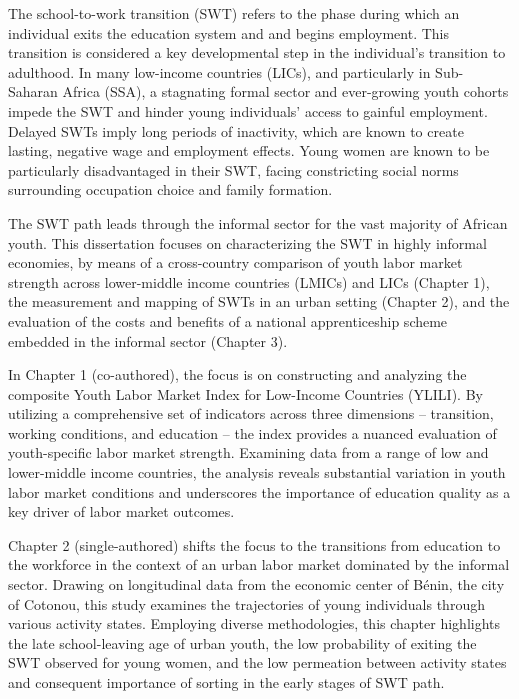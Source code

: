The school-to-work transition (SWT) refers to the phase during which an individual exits the education system and and begins employment. This transition is considered a key developmental step in the individual's transition to adulthood. In many low-income countries (LICs), and particularly in Sub-Saharan Africa (SSA), a stagnating formal sector and ever-growing youth cohorts impede the SWT and hinder young individuals' access to gainful employment. Delayed SWTs imply long periods of inactivity, which are known to create lasting, negative wage and employment effects. Young women are known to be particularly disadvantaged in their SWT, facing constricting social norms surrounding occupation choice and family formation.

The SWT path leads through the informal sector for the vast majority of African youth. This dissertation focuses on characterizing the SWT in highly informal economies, by means of a cross-country comparison of youth labor market strength across lower-middle income countries (LMICs) and LICs (Chapter 1), the measurement and mapping of SWTs in an urban setting (Chapter 2), and the evaluation of the costs and benefits of a national apprenticeship scheme embedded in the informal sector (Chapter 3).

In Chapter 1 (co-authored), the focus is on constructing and analyzing the composite Youth Labor Market Index for Low-Income Countries (YLILI). By utilizing a comprehensive set of indicators across three dimensions -- transition, working conditions, and education -- the index provides a nuanced evaluation of youth-specific labor market strength. Examining data from a range of low and lower-middle income countries, the analysis reveals substantial variation in youth labor market conditions and underscores the importance of education quality as a key driver of labor market outcomes.

Chapter 2 (single-authored) shifts the focus to the transitions from education to the workforce in the context of an urban labor market dominated by the informal sector. Drawing on longitudinal data from the economic center of Bénin, the city of Cotonou, this study examines the trajectories of young individuals through various activity states. Employing diverse methodologies, this chapter highlights the late school-leaving age of urban youth, the low probability of exiting the SWT observed for young women, and the low permeation between activity states and consequent importance of sorting in the early stages of SWT path.

